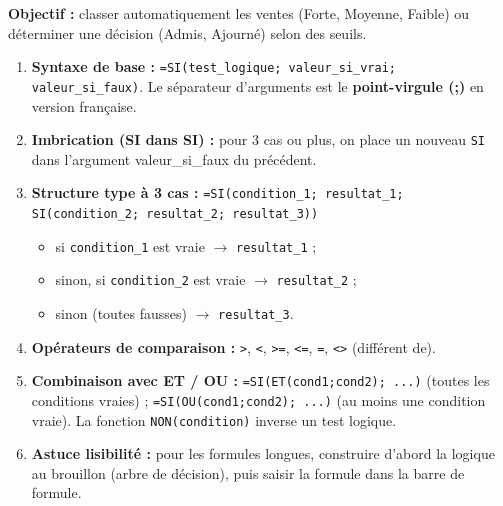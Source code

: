 \documentclass[11pt]{article}
\begin{document}
\begin{methode}
\textbf{Objectif :} classer automatiquement les ventes (\og{}Forte\fg{}, \og{}Moyenne\fg{}, \og{}Faible\fg{}) ou déterminer une décision (\og{}Admis\fg{}, \og{}Ajourné\fg{}) selon des seuils.
\begin{enumerate}
    \item \textbf{Syntaxe de base :} \texttt{=SI(test\_logique; valeur\_si\_vrai; valeur\_si\_faux)}. Le séparateur d'arguments est le \textbf{point-virgule (;)} en version française.
    \item \textbf{Imbrication (SI dans SI) :} pour 3 cas ou plus, on place un nouveau \texttt{SI} dans l'argument \og{}valeur\_si\_faux\fg{} du précédent.
    \item \textbf{Structure type à 3 cas :}
    \texttt{=SI(condition\_1; resultat\_1; SI(condition\_2; resultat\_2; resultat\_3))}
    \begin{itemize}
        \item si \texttt{condition\_1} est vraie $\rightarrow$ \texttt{resultat\_1} ;
        \item sinon, si \texttt{condition\_2} est vraie $\rightarrow$ \texttt{resultat\_2} ;
        \item sinon (toutes fausses) $\rightarrow$ \texttt{resultat\_3}.
    \end{itemize}
    \item \textbf{Opérateurs de comparaison :} \texttt{>}, \texttt{<}, \texttt{>=}, \texttt{<=}, \texttt{=}, \texttt{<>} (différent de).
    \item \textbf{Combinaison avec ET / OU :} \texttt{=SI(ET(cond1;cond2); ...)} (toutes les conditions vraies) ; \texttt{=SI(OU(cond1;cond2); ...)} (au moins une condition vraie). La fonction \texttt{NON(condition)} inverse un test logique.
    \item \textbf{Astuce lisibilité :} pour les formules longues, construire d'abord la logique au brouillon (arbre de décision), puis saisir la formule dans la barre de formule.
\end{enumerate}
\end{methode}
\end{document}
